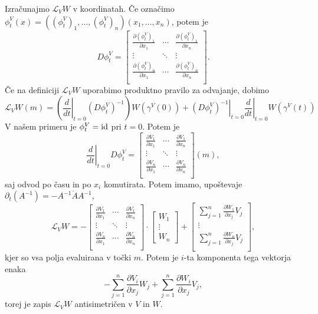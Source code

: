 Izračunajmo $\mathcal{L}_V W$ v koordinatah.
Če označimo $\phi^V_t(x) = ((\phi^V_t)_1, \ldots, (\phi^V_t)_n)(x_1, \ldots,
x_n)$, potem je
\[
  D \phi^V_t =
  \begin{bmatrix}
	\frac{\partial (\phi^V_t)_1}{\partial x_1} & \cdots & \frac{\partial
														  (\phi^V_t)_1}{\partial
														  x_n} \\
	\vdots & \ddots & \vdots \\
	\frac{\partial (\phi^V_t)_n}{\partial x_1} & \cdots & \frac{\partial
														  (\phi^V_t)_n}{\partial
														  x_n} \\
  \end{bmatrix}.
\]
Če na definiciji $\mathcal{L}_V W$ uporabimo produktno pravilo za odvajanje,
dobimo
\[
  \mathcal{L}_V W(m)
  = \left( \left. \frac{d}{dt} \right|_{t=0} \left( D \phi_t^V \right)^{-1}
  \right) W(\gamma^V(0))
  + \left. \left( D \phi_t^V \right)^{-1} \right|_{t=0}
  \left. \frac{d}{dt} \right|_{t=0} W(\gamma^V(t))
\]
V našem primeru je $\phi^V_t = \operatorname{id}$ pri $t = 0$.
Potem je
\[
  \left.\frac{d}{dt} \right|_{t=0} D \phi^V_t =
  \begin{bmatrix}
	\frac{\partial V_1}{\partial x_1} & \cdots & \frac{\partial V_1}{\partial
												 x_n} \\
	\vdots & \ddots & \vdots \\
	\frac{\partial V_n}{\partial x_1} & \cdots & \frac{\partial V_n}{\partial
												 x_n} \\
  \end{bmatrix}(m),
\]
saj odvod po času in po $x_i$ komutirata.
Potem imamo, upoštevaje $\partial_t (A^{-1}) = -A^{-1} \dot{A} A^{-1}$,
\[
  \mathcal{L}_V W =
  -
  \begin{bmatrix}
	\frac{\partial V_1}{\partial x_1} & \cdots & \frac{\partial V_1}{\partial
												 x_n} \\
	\vdots & \ddots & \vdots \\
	\frac{\partial V_n}{\partial x_1} & \cdots & \frac{\partial V_n}{\partial
												 x_n} \\
  \end{bmatrix}
  \cdot
  \begin{bmatrix}
	W_1 \\ \vdots \\ W_n
  \end{bmatrix}
  +
  \begin{bmatrix}
	\sum_{j=1}^n \frac{\partial W_1}{\partial x_j} V_j \\
	\vdots \\
	\sum_{j=1}^n \frac{\partial W_n}{\partial x_j} V_j \\
  \end{bmatrix},
\]
kjer so vsa polja evaluirana v točki $m$.
Potem je $i$-ta komponenta tega vektorja enaka
\[
  - \sum_{j=1}^n \frac{\partial V_i}{\partial x_j} W_j + \sum_{j=1}^n
  \frac{\partial W_i}{\partial x_j} V_j,
\]
torej je zapis $\mathcal{L}_V W$ antisimetričen v $V$ in $W$.

